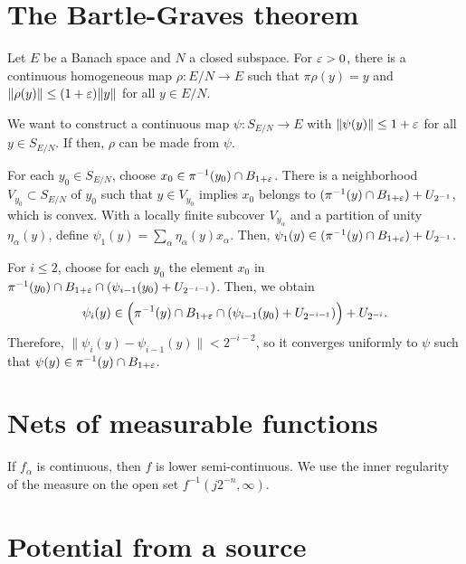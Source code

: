 \documentclass[a4paper]{article}
\begin{document}
\tableofcontents

\newpage
\section{The Bartle-Graves theorem}
Let $E$ be a Banach space and $N$ a closed subspace.
For $\varepsilon>0$, there is a continuous homogeneous map $\rho:E/N\to E$ such that $\pi\rho(y)=y$ and $\|\rho(y)\|\le(1+\varepsilon)\|y\|$ for all $y\in E/N$.
\begin{pf}
We want to construct a continuous map $\psi:S_{E/N}\to E$ with $\|\psi(y)\|\le1+\varepsilon$ for all $y\in S_{E/N}$.
If then, $\rho$ can be made from $\psi$.

For each $y_0\in S_{E/N}$, choose $x_0\in\pi^{-1}(y_0)\cap B_{1+\varepsilon}$.
There is a neighborhood $V_{y_0}\subset S_{E/N}$ of $y_0$ such that $y\in V_{y_0}$ implies $x_0$ belongs to $(\pi^{-1}(y)\cap B_{1+\varepsilon})+U_{2^{-1}}$, which is convex.
With a locally finite subcover $V_{y_\alpha}$ and a partition of unity $\eta_\alpha(y)$, define $\psi_1(y)=\sum_\alpha\eta_\alpha(y)x_\alpha$.
Then, $\psi_1(y)\in(\pi^{-1}(y)\cap B_{1+\varepsilon})+U_{2^{-1}}$.

For $i\le2$, choose for each $y_0$ the element $x_0$ in $\pi^{-1}(y_0)\cap B_{1+\varepsilon}\cap(\psi_{i-1}(y_0)+U_{2^{-{i-1}}})$.
Then, we obtain
\[\psi_i(y)\in\Bigl(\pi^{-1}(y)\cap B_{1+\varepsilon}\cap(\psi_{i-1}(y_0)+U_{2^{-{i-1}}})\Bigr)+U_{2^{-i}}.\]
Therefore, $\|\psi_i(y)-\psi_{i-1}(y)\|<2^{-{i-2}}$, so it converges uniformly to $\psi$ such that $\psi(y)\in\pi^{-1}(y)\cap B_{1+\varepsilon}$.
\end{pf}


\newpage

\section{Nets of measurable functions}
\begin{prb}
\begin{parts}
\item 
\end{parts}
\end{prb}
If $f_\alpha$ is continuous, then $f$ is lower semi-continuous.
We use the inner regularity of the measure on the open set $f^{-1}(j2^{-n},\infty)$.

\newpage

\section{Potential from a source}
\end{document}

